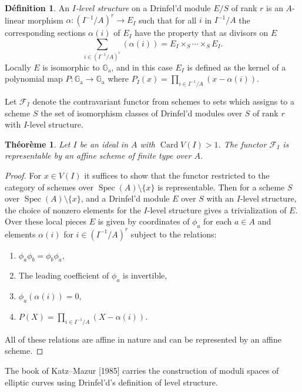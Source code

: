 \documentclass[12pt,a4paper]{article}
\theoremstyle{plain}
\newtheorem{theorem}{Th\'eor\`eme}[section]
\theoremstyle{definition}
\newtheorem{definition}{D\'efinition}[section]
\theoremstyle{remark}
\DeclareMathOperator{\Spec}{Spec}
\DeclareMathOperator{\Card}{Card}
\newcommand{\cF}{\mathcal{F}}
\newcommand{\Ga}{\mathbb{G}_\mathrm{a}}
\providecommand{\Ga}{\mathbb{G}_{\mathrm a}}
\providecommand{\cF}{\mathcal{F}}
\providecommand{\Spec}{\operatorname{Spec}}
\begin{document}
\begin{definition}
\label{def:level}
An \emph{$I$-level structure} on a Drinfel'd module $E/S$ of rank $r$ is an $A$-linear morphism $\alpha: (I^{-1}/A)^r \to E_I$ such that for all $i$ in $I^{-1}/A$ the corresponding sections $\alpha(i)$ of $E_I$ have the property that as divisors on $E$
\[
\sum_{i \in (I^{-1}/A)^r} (\alpha(i)) = E_I \times_S \cdots \times_S E_I.
\]
Locally $E$ is isomorphic to $\Ga$, and in this case $E_I$ is defined as the kernel of a polynomial map $P: \Ga \to \Ga$ where $P_I(x) = \prod_{i \in I^{-1}/A} (x - \alpha(i))$.
\end{definition}

Let $\cF_I$ denote the contravariant functor from schemes to sets which assigns to a scheme $S$ the set of isomorphism classes of Drinfel'd modules over $S$ of rank $r$ with $I$-level structure.

\begin{theorem}
\label{thm:moduli}
Let $I$ be an ideal in $A$ with $\Card V(I) > 1$. The functor $\cF_I$ is representable by an affine scheme of finite type over $A$.
\end{theorem}

\begin{proof}
For $x \in V(I)$ it suffices to show that the functor restricted to the category of schemes over $\Spec(A) \setminus \{x\}$ is representable. Then for a scheme $S$ over $\Spec(A) \setminus \{x\}$, and a Drinfel'd module $E$ over $S$ with an $I$-level structure, the choice of nonzero elements for the $I$-level structure gives a trivialization of $E$. Over these local pieces $E$ is given by coordinates of $\phi_a$ for each $a \in A$ and elements $\alpha(i)$ for $i \in (I^{-1}/A)^r$ subject to the relations:
\begin{enumerate}[label=(\alph*)]
\item $\phi_a \phi_b = \phi_b \phi_a$,
\item The leading coefficient of $\phi_a$ is invertible,
\item $\phi_a(\alpha(i)) = 0$,
\item $P(X) = \prod_{i \in I^{-1}/A} (X - \alpha(i))$.
\end{enumerate}
All of these relations are affine in nature and can be represented by an affine scheme.
\end{proof}

The book of Katz--Mazur [1985] carries the construction of moduli spaces of elliptic curves using Drinfel'd's definition of level structure.
\end{document}
